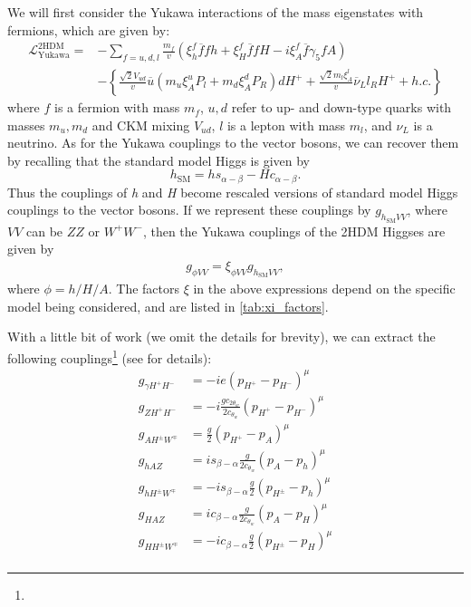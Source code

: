 We will first consider the Yukawa interactions of the mass eigenstates with fermions, which are given by:
\begin{align*}
\mathcal{L}^{\mathrm{2HDM}}_{\text{Yukawa}} =& - \sum_{f = u, d, l} \frac{m_f}{v}
\left(\xi_h^f \overline{f}fh+\xi_H^f \overline{f}fH-i\xi_A^f \overline{f}\gamma_5fA \right)\\
&-\left\{\frac{\sqrt{2}V_{ud}}{v}\overline{u}\left(m_u\xi_A^uP_l+m_d\xi_A^dP_R\right)dH^+ + \frac{\sqrt{2}m_l\xi^l_A}{v}\overline{\nu}_Ll_RH^+ + h.c.\right\}
\end{align*}
where $f$ is a fermion with mass $m_f$, $u,d$ refer to up- and down-type quarks with masses $m_u,m_d$ and CKM mixing $V_{ud}$, $l$ is a lepton with mass $m_l$, and $\nu_L$ is a neutrino. 
As for the Yukawa couplings to the vector bosons, we can recover them by recalling that the standard model Higgs is given by
\begin{equation}
h_\text{SM} = hs_{\alpha-\beta}-Hc_{\alpha-\beta}.
\end{equation}
Thus the couplings of \emph{h} and \emph{H} become rescaled versions of standard model Higgs couplings to the vector bosons. If we represent these couplings by $g_{h_\text{SM}VV}$, where $VV$ can be $ZZ$ or $W^+W^-$, then the Yukawa couplings of the 2HDM Higgses are given by
\begin{align}
g_{\phi VV} = \xi_{\phi VV}g_{h_\text{SM}VV},
\end{align}
where $\phi = h/H/A$. The factors $\xi$ in the above expressions depend on the specific model being considered, and are listed in \autoref{tab:xi_factors}.

With a little bit of work (we omit the details for brevity), we can extract the following couplings\footnote{} (see \citep{Kling2016a} for details):
\begin{align*}
g_{\gamma H^+H^-} &= -ie(p_{H^+}-p_{H^-})^\mu\\
g_{ZH^+H^-} &= -i\frac{gc_{2\theta_w}}{2c_{\theta_w}}(p_{H^+}-p_{H^-})^\mu\\
g_{AH^\pm W^\mp} &= \frac{g}{2}(p_{H^+}-p_{A})^\mu\\
g_{hAZ} &= is_{\beta-\alpha}\frac{g}{2c_{\theta_w}}(p_A-p_h)^\mu\\
g_{hH^\pm W^\mp} &= -is_{\beta-\alpha}\frac{g}{2}(p_{H^\pm}-p_h)^\mu\\
g_{HAZ} &= ic_{\beta-\alpha}\frac{g}{2c_{\theta_w}}(p_A-p_H)^\mu\\
g_{HH^\pm W^\mp} &= -ic_{\beta-\alpha}\frac{g}{2}(p_{H^\pm}-p_H)^\mu\\
\end{align*}

